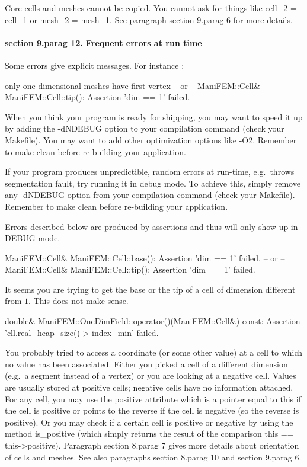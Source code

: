 {Core cells and meshes cannot be copied.
You cannot ask for things like {\codett cell\_2 = cell\_1} or {\codett mesh\_2 =
mesh\_1}.
See paragraph \numb section 9.\numb parag 6 for more details.


\paragraph{\numb section 9.\numb parag 12. Frequent errors at run time}

Some errors give explicit messages. For instance :

\verbatim
only one-dimensional meshes have first vertex
-- or --
ManiFEM::Cell& ManiFEM::Cell::tip(): Assertion 'dim == 1' failed.
\endverbatim
\smallskip

When you think your program is ready for shipping, you may want to speed it up
by adding the {\codett -dNDEBUG} option to your compilation command
(check your {\codett Makefile}).
You may want to add other optimization options like {\codett -O2}.
Remember to {\codett make clean} before re-building your application.

If your program produces unpredictible, random errors at run-time, e.g.\ throws
{\codett segmentation fault}, try running it in debug mode.
To achieve this, simply remove any {\codett -dNDEBUG} option from your compilation
command (check your {\codett Makefile}).
Remember to {\codett make clean} before re-building your application.

Errors described below are produced by {\codett assert}ions and thus will
only show up in {\codett DEBUG} mode.

\smallskip\verbatim
ManiFEM::Cell& ManiFEM::Cell::base(): Assertion 'dim == 1' failed.
-- or --
ManiFEM::Cell& ManiFEM::Cell::tip(): Assertion 'dim == 1' failed.
\endverbatim

It seems you are trying to get the base or the tip of a cell of dimension
different from $1$.
This does not make sense.

\medskip\verbatim
double& ManiFEM::OneDimField::operator()(ManiFEM::Cell&) const:
Assertion 'cll.real_heap_size() > index_min' failed.
\endverbatim

You probably tried to access a coordinate (or some other value) at a cell to which 
no value has been associated.
Either you picked a cell of a different dimension (e.g.\ a segment instead of a
vertex) or you are looking at a negative cell.
Values are usually stored at positive cells; negative cells have no information attached.
For any cell, you may use the {\codett positive} attribute which is a pointer
equal to {\codett this} if the cell is positive or points to the reverse if
the cell is negative (so the reverse is positive).
Or you may check if a certain cell is positive or negative by using the method
{\codett is\_positive} (which simply returns the result of the comparison {\codett
this == this->positive}).
Paragraph \numb section 8.\numb parag 7 gives more details about orientation of
cells and meshes.
See also paragraphs \numb section 8.\numb parag 10 and \numb section 9.\numb parag 6.

}
